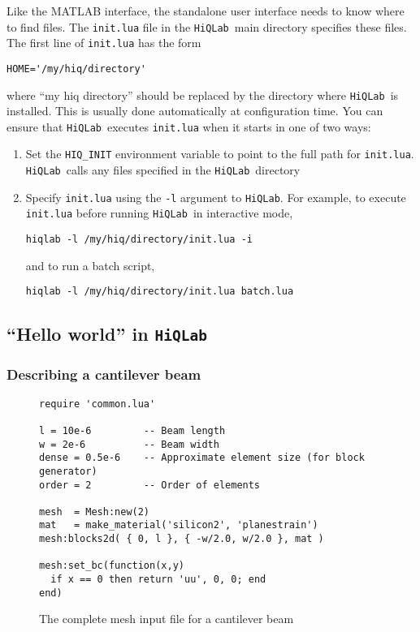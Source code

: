 \documentclass{article}
\newcommand{\hiq}{\texttt{HiQLab}}
\newcommand{\ttt}[1]{\texttt{#1}}
\begin{document}
Like the MATLAB interface, the standalone user interface needs to know
where to find files.  The \ttt{init.lua} file in the \hiq\ main
directory specifies these files.  The first line of \ttt{init.lua}
has the form
\begin{verbatim}
HOME='/my/hiq/directory'
\end{verbatim}
where ``my hiq directory'' should be replaced by the directory
where \hiq\ is installed.  This is usually done automatically at
configuration time.  You can ensure that \hiq\ executes
\ttt{init.lua} when it starts in one of two ways:
\begin{enumerate}
\item Set the \ttt{HIQ\_INIT} environment variable to point to the
  full path for \ttt{init.lua}.  \hiq\ calls any files specified in
  the \hiq\ directory
\item Specify \ttt{init.lua} using the \ttt{-l} argument to
  \hiq.  For example, to execute \ttt{init.lua} before running
  \hiq\ in interactive mode,
\begin{verbatim}
hiqlab -l /my/hiq/directory/init.lua -i
\end{verbatim}
  and to run a batch script,
\begin{verbatim}
hiqlab -l /my/hiq/directory/init.lua batch.lua
\end{verbatim}
\end{enumerate}


\subsection{``Hello world'' in \hiq}

\subsubsection{Describing a cantilever beam}

\begin{figure}
\begin{verbatim}
require 'common.lua'
 
l = 10e-6         -- Beam length
w = 2e-6          -- Beam width
dense = 0.5e-6    -- Approximate element size (for block generator)
order = 2         -- Order of elements
 
mesh  = Mesh:new(2)
mat   = make_material('silicon2', 'planestrain')
mesh:blocks2d( { 0, l }, { -w/2.0, w/2.0 }, mat )
 
mesh:set_bc(function(x,y)
  if x == 0 then return 'uu', 0, 0; end
end)
\end{verbatim}
\caption{The complete mesh input file for a cantilever beam}
\label{mesh-input-fig}
\end{figure}
\end{document}
